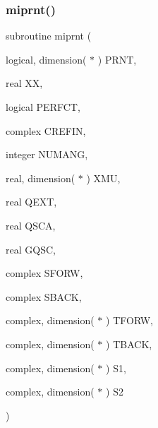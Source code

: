 \mbox{\label{_m_i_e_v0no_p_8f_ae5c893640b8e33659ca8a9eb3c3c26ce}} 
\subsubsection{\texorpdfstring{miprnt()}{miprnt()}}
{\footnotesize\ttfamily subroutine miprnt (\begin{DoxyParamCaption}\item[{logical, dimension( $\ast$ )}]{P\+R\+NT,  }\item[{real}]{XX,  }\item[{logical}]{P\+E\+R\+F\+CT,  }\item[{complex}]{C\+R\+E\+F\+IN,  }\item[{integer}]{N\+U\+M\+A\+NG,  }\item[{real, dimension( $\ast$ )}]{X\+MU,  }\item[{real}]{Q\+E\+XT,  }\item[{real}]{Q\+S\+CA,  }\item[{real}]{G\+Q\+SC,  }\item[{complex}]{S\+F\+O\+RW,  }\item[{complex}]{S\+B\+A\+CK,  }\item[{complex, dimension( $\ast$ )}]{T\+F\+O\+RW,  }\item[{complex, dimension( $\ast$ )}]{T\+B\+A\+CK,  }\item[{complex, dimension( $\ast$ )}]{S1,  }\item[{complex, dimension( $\ast$ )}]{S2 }\end{DoxyParamCaption})}

\mbox{\label{_m_i_e_v0no_p_8f_a42db51d8245d25e068704071519e108f}} 
